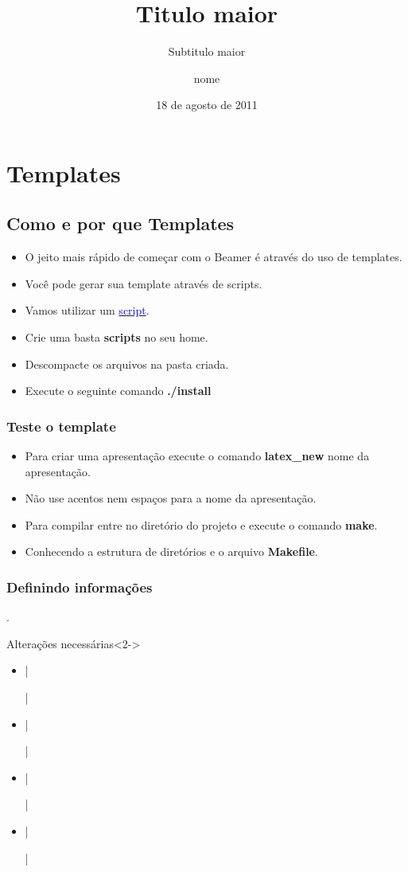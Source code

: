 \section{Templates}
\subsection{Como e por que Templates}

\begin{frame}
  \begin{itemize}[<+->]
     \item  O jeito mais rápido de começar com o Beamer é através do uso de templates.
     \item  Você pode gerar sua template através de scripts.
     \item  Vamos utilizar um \href{http:\\www.inf.ufpr.br/diego/minicurso\_latex}{\textcolor{blue}{script}}.
     \item  Crie uma basta \textbf{scripts} no seu home.
     \item  Descompacte os arquivos na pasta criada.
     \item  Execute o seguinte comando \textbf{./install}
  \end{itemize}
\end{frame}

\begin{frame}
  \frametitle{Teste o template}
  \begin{itemize}[<+->]
     \item Para criar uma apresentação execute o comando \textbf{latex\_new} nome da apresentação.
     \item Não use acentos nem espaços para a nome da apresentação.
     \item Para compilar entre no diretório do projeto e execute o comando \textbf{make}.
     \item Conhecendo a estrutura de diretórios e o arquivo \textbf{Makefile}.
  \end{itemize}
\end{frame}

\begin{frame}[fragile]
  \frametitle{Definindo informações}

    .

    \begin{block}{Alterações necessárias}<2->
      \begin{itemize}
         \item <2->  |\title[Titulo menor]{Titulo maior}|
         \item <3->  |\subtitle[Titulo menor]{Subtitulo maior}|
         \item <4->  |\author[sobrenome]{nome}|
         \item <5->  |\date[18/08/2011]{18 de agosto de 2011}|
     \end{itemize}
    \end{block}
\end{frame}
